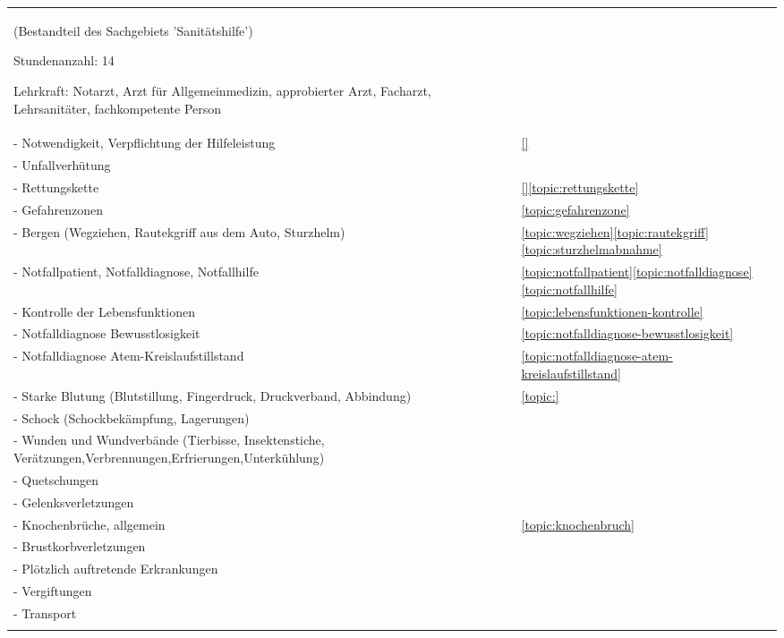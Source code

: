 \begin{xtabular}{p{10cm}p{5cm}}


(Bestandteil des Sachgebiets 'Sanitätshilfe') 

\begin{inparadesc}
\item[Stundenanzahl:] 14
\item[Lehrkraft:] Notarzt, Arzt für Allgemeinmedizin, approbierter Arzt,
Facharzt, Lehrsanitäter, fachkompetente Person  
\end{inparadesc}
\\
- Notwendigkeit, Verpflichtung der Hilfeleistung
& 
\ref{}\noindent{}
\\
- Unfallverhütung          
& 
\noindent{}
\\
- Rettungskette           
& 
\ref{}\noindent\ref{topic:rettungskette}
\\
- Gefahrenzonen            
& 
\noindent\ref{topic:gefahrenzone}
\\
 - Bergen (Wegziehen, Rautekgriff aus dem  Auto, Sturzhelm)         
& 
\noindent\ref{topic:wegziehen}\ref{topic:rautekgriff}\ref{topic:sturzhelmabnahme}
\\
 - Notfallpatient, Notfalldiagnose, Notfallhilfe
& 
\noindent\ref{topic:notfallpatient}\ref{topic:notfalldiagnose}\ref{topic:notfallhilfe}
\\
 - Kontrolle der Lebensfunktionen
& 
\noindent\ref{topic:lebensfunktionen-kontrolle}
\\
 - Notfalldiagnose Bewusstlosigkeit
& 
\ref{topic:notfalldiagnose-bewusstlosigkeit}
\\
- Notfalldiagnose  Atem-Kreislaufstillstand
& 
\noindent\ref{topic:notfalldiagnose-atem-kreislaufstillstand}
\\
- Starke Blutung (Blutstillung, Fingerdruck,  Druckverband, Abbindung)
& 
\noindent\ref{topic:}
\\
 - Schock (Schockbekämpfung,  Lagerungen)
& 
\noindent{}
\\
- Wunden und Wundverbände (Tierbisse, Insektenstiche, Verätzungen,Verbrennungen,Erfrierungen,Unterkühlung)
& 
\noindent{}
\\
- Quetschungen
& 
\noindent{}
\\
- Gelenksverletzungen
& 
\noindent{}
\\
- Knochenbrüche, allgemein
& 
\noindent\ref{topic:knochenbruch}
\\
- Brustkorbverletzungen
& 
\noindent{}
\\
- Plötzlich auftretende Erkrankungen
& 
\noindent{}
\\
- Vergiftungen
& 
\noindent{}
\\
- Transport
& 
\noindent{}
\\\toprule
{}  


\end{xtabular}
